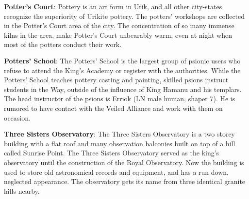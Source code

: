 {	\textbf{Potter's Court}: Pottery is an art form in Urik, and all other city-states recognize the superiority of Urikite pottery. The potters' workshops are collected in the Potter's Court area of the city. The concentration of so many immense kilns in the area, make Potter's Court unbearably warm, even at night when most of the potters conduct their work.

	\textbf{Potters' School}: The Potters' School is the largest group of psionic users who refuse to attend the King's Academy or register with the authorities. While the Potters' School teaches pottery casting and painting, skilled psions instruct students in the Way, outside of the influence of King Hamanu and his templars. The head instructor of the psions is Erriok (LN male human, shaper 7). He is rumored to have contact with the Veiled Alliance and work with them on occasion.

	\textbf{Three Sisters Observatory}: The Three Sisters Observatory is a two storey building with a flat roof and many observation balconies built on top of a hill called Sunrise Point. The Three Sisters Observatory served as the king's observatory until the construction of the Royal Observatory. Now the building is used to store old astronomical records and equipment, and has a run down, neglected appearance. The observatory gets its name from three identical granite hills nearby.
}
